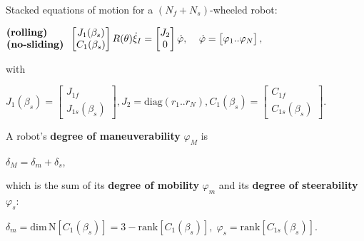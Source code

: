 \documentclass[landscape]{article}
\newcommand{\vmspace}{\vspace{-7pt}}
\newcommand{\vpspace}{\vspace{5pt}}
\begin{document}
\begin{multicols}{3}
\vpspace

\begin{minipage}{\columnwidth}
  Stacked equations of motion for a $(N_f+N_s)$-wheeled robot:
  \vmspace
  \begin{center}
    $\begin{matrix}
      \text{\textbf{(rolling)}}\;\;\;\;\;\; \\
      \text{\textbf{(no-sliding)}}
    \end{matrix}\;\;
    \left[\begin{matrix}
      J_1(\beta_s) \\
      C_1(\beta_s)
    \end{matrix}\right]
    R(\theta)\dot\xi_I
    =
    \left[\begin{matrix}
      J_2 \\
      0
    \end{matrix}\right]
    \dot\varphi,\;\;\;\;
    \dot\varphi
    =
    \left[\begin{matrix}
      \varphi_1..\varphi_N
    \end{matrix}\right],$
  \end{center}
\end{minipage}

\begin{minipage}{\columnwidth}
  with
  \vmspace
  \begin{center}
    $J_1(\beta_s)
    =
    \left[\begin{matrix}
      J_{1f} \\
      J_{1s}(\beta_s)
    \end{matrix}\right],
    J_2
    =
    \mathrm{diag}(r_1..r_N),
    C_1(\beta_s)
    =
    \left[\begin{matrix}
      C_{1f} \\
      C_{1s}(\beta_s)
    \end{matrix}\right].$
  \end{center}
\end{minipage}

\vpspace

\begin{minipage}{\columnwidth}
  A robot's \textbf{degree of maneuverability} $\varphi_M$ is
  \vmspace
  \begin{center}
    $\delta_M = \delta_m + \delta_s$,
  \end{center}
  \vmspace
  which is the sum of its \textbf{degree of mobility} $\varphi_m$ and its
  \textbf{degree of steerability} $\varphi_s$:
  \vmspace
  \begin{center}
    $\delta_m=\mathrm{dim}\,\mathrm{N}\left[C_1(\beta_s)\right] = 3 -
    \mathrm{rank}\left[C_1(\beta_s)\right],\;
    \varphi_s = \mathrm{rank}\left[C_{1s}(\beta_s)\right].$
  \end{center}
\end{minipage}


\end{multicols}
\end{document}
